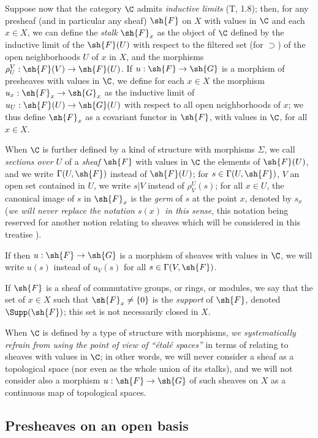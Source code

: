 \begin{env}[3.1.6]
\label{0.3.1.6}
Suppose now that the category $\C$ admits \emph{inductive limits} (T, 1.8);
then, for any presheaf (and in particular any sheaf) $\sh{F}$ on $X$ with values
in $\C$ and each $x\in X$, we can define the \emph{stalk} $\sh{F}_x$ as the
object of $\C$ defined by the inductive limit of the $\sh{F}(U)$ with respect to
the filtered set (for $\supset$) of the open neighborhoods $U$ of $x$ in $X$,
and the morphisms $\rho_U^V:\sh{F}(V)\to\sh{F}(U)$. If $u:\sh{F}\to\sh{G}$ is a
morphism of presheaves with values in $\C$, we define for each $x\in X$ the
morphism $u_x:\sh{F}_x\to\sh{G}_x$ as the inductive limit of
$u_U:\sh{F}(U)\to\sh{G}(U)$ with respect to all open neighborhoods of $x$; we
thus define $\sh{F}_x$ as a covariant functor in $\sh{F}$, with values in $\C$,
for all $x\in X$.

When $\C$ is further defined by a kind of structure with morphisms $\Sigma$, we
call \emph{sections over $U$} of a \emph{sheaf} $\sh{F}$ with values in $\C$ the
elements of $\sh{F}(U)$, and we write $\Gamma(U,\sh{F})$ instead of $\sh{F}(U)$;
for $s\in\Gamma(U,\sh{F})$, $V$ an open set contained in $U$, we write $s|V$
instead of $\rho_V^U(s)$; for all $x\in U$, the canonical image of $s$ in
$\sh{F}_x$ is the \emph{germ} of $s$ at the point $x$, denoted by $s_x$
(\emph{we will never replace the notation $s(x)$ in this sense}, this notation
being reserved for another notion relating to sheaves which will be considered
in this treatise ).

If then $u:\sh{F}\to\sh{G}$ is a morphism of sheaves with values in $\C$, we
will write $u(s)$ instead of $u_V(s)$ for all $s\in\Gamma(V,\sh{F})$.

If $\sh{F}$ is a sheaf of commutative groups, or rings, or modules, we say that
the set of $x\in X$ such that $\sh{F}_x\neq\{0\}$ is the \emph{support} of
$\sh{F}$, denoted $\Supp(\sh{F})$; this set is not necessarily closed in $X$.

When $\C$ is defined by a type of structure with morphisms, \emph{we
systematically refrain from using the point of view of ``\'etal\'e spaces''} in
terms of relating to sheaves with values in $\C$; in other words, we will never
consider a sheaf as a topological space (nor even as the whole union of its
stalks), and we will not consider also a morphism $u:\sh{F}\to\sh{G}$ of such
sheaves on $X$ as a continuous map of topological spaces.
\end{env}

\subsection{Presheaves on an open basis}
\label{subsection:presheaves-on-open-basis}

